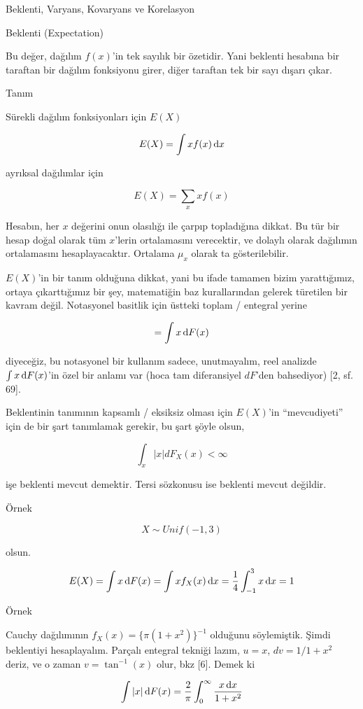 \documentclass[12pt,fleqn]{article}\usepackage{../../common}
\begin{document}
Beklenti, Varyans, Kovaryans ve Korelasyon

Beklenti (Expectation) 

Bu değer, dağılım $f(x)$'in tek sayılık bir özetidir. Yani beklenti hesabına
bir taraftan bir dağılım fonksiyonu girer, diğer taraftan tek bir sayı
dışarı çıkar. 

Tanım

Sürekli dağılım fonksiyonları için $E(X)$

$$  E(X) = \int x f(x) \,\mathrm{d} x$$

ayrıksal dağılımlar için

$$ E(X) = \sum_x xf(x) $$

Hesabın, her $x$ değerini onun olasılığı ile çarpıp topladığına dikkat. Bu
tür bir hesap doğal olarak tüm $x$'lerin ortalamasını verecektir, ve
dolaylı olarak dağılımın ortalamasını hesaplayacaktır. Ortalama $\mu_x$
olarak ta gösterilebilir.

$E(X)$'in bir tanım olduğuna dikkat, yani bu ifade tamamen bizim
yarattığımız, ortaya çıkarttığımız bir şey, matematiğin baz kurallarından
gelerek türetilen bir kavram değil. Notasyonel basitlik için üstteki toplam
/ entegral yerine

$$ = \int x \,\mathrm{d} F(x) $$

diyeceğiz, bu notasyonel bir kullanım sadece, unutmayalım, reel analizde
$\int x \,\mathrm{d} F(x)$'in özel bir anlamı var (hoca tam diferansiyel $dF$'den
bahsediyor) [2, sf. 69]. 

Beklentinin tanımının kapsamlı / eksiksiz olması için $E(X)$'in
``mevcudiyeti'' için de bir şart tanımlamak gerekir, bu şart şöyle olsun, 

$$ \int_x |x|dF_X(x) < \infty $$

işe beklenti mevcut demektir. Tersi sözkonusu ise beklenti mevcut
değildir. 

Örnek 

$$
X \sim Unif(-1,3)
$$

olsun.

$$
E(X) = \int x \,\mathrm{d} F(x) = \int x f_X(x) \,\mathrm{d} x
= \frac{1}{4} \int _{ -1}^{3} x \,\mathrm{d} x = 1
$$

Örnek 

Cauchy dağılımının $f_X(x) = \{ \pi (1+x^2) \} ^{-1}$ olduğunu
söylemiştik. Şimdi beklentiyi hesaplayalım. Parçalı entegral tekniği lazım,
$u=x$, $dv = 1/1+x^2$ deriz, ve o zaman $v = \tan ^{-1}(x)$ olur, bkz
[6]. Demek ki

$$
\int |x| \,\mathrm{d} F(x)
= \frac{ 2}{\pi} \int _{ 0}^{\infty}\frac{x \,\mathrm{d} x}{1+x^2}
$$
\end{document}
